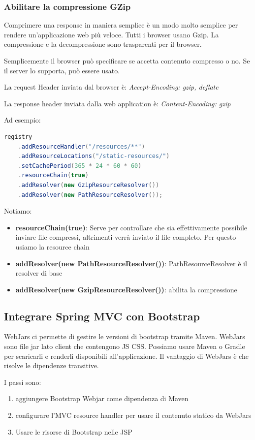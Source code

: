 \documentclass[11pt,a4paper]{book}
\begin{document}
\subsubsection{Abilitare la compressione GZip}
Comprimere una response in maniera semplice è un modo molto semplice per rendere un'applicazione web più veloce. Tutti i browser usano Gzip. La compressione e la decompressione sono trasparenti per il browser.

Semplicemente il browser può specificare se accetta contenuto compresso o no. Se il server lo supporta, può essere usato.

La request Header inviata dal browser è: \emph{Accept-Encoding: gzip, deflate}

La response header inviata dalla web application è: \emph{Content-Encoding: gzip}

Ad esempio:
\begin{lstlisting}[language = Java]
registry
	.addResourceHandler("/resources/**")
	.addResourceLocations("/static-resources/")
	.setCachePeriod(365 * 24 * 60 * 60)
	.resourceChain(true)
	.addResolver(new GzipResourceResolver())
	.addResolver(new PathResourceResolver());
\end{lstlisting}

Notiamo:
\begin{itemize}
	\item \textbf{resourceChain(true)}: Serve per controllare che sia effettivamente possibile inviare file compressi, altrimenti verrà inviato il file completo. Per questo usiamo la resource chain
	\item \textbf{addResolver(new PathResourceResolver())}:  PathResourceResolver è il resolver di base
	\item \textbf{addResolver(new GzipResourceResolver())}: abilita la compressione
\end{itemize}

\subsection{Integrare Spring MVC con Bootstrap}
WebJars ci permette di gestire le versioni di bootstrap tramite Maven. WebJars sono file jar lato client che contengono JS  CSS. Possiamo usare Maven o Gradle per scaricarli e renderli disponibili all'applicazione. Il vantaggio di WebJars è che risolve le dipendenze transitive.

I passi sono:
\begin{enumerate}
	\item aggiungere Bootstrap Webjar come dipendenza di Maven
	\item configurare l'MVC resource handler per usare il contenuto statico da WebJars
	\item Usare le risorse di Bootstrap nelle JSP
\end{enumerate}
\end{document}
